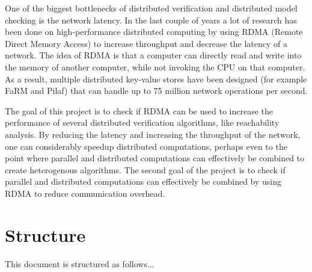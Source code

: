 One of the biggest bottlenecks of distributed verification and distributed model checking is the network latency. In the last couple of years a lot of research has been done on high-performance distributed computing by using RDMA (Remote Direct Memory Access) to increase throughput and decrease the latency of a network. The idea of RDMA is that a computer can directly read and write into the memory of another computer, while not invoking the CPU on that computer. As a result, multiple distributed key-value stores have been designed (for example FaRM and Pilaf) that can handle up to 75 million network operations per second. 

The goal of this project is to check if RDMA can be used to increase the performance of several distributed verification algorithms, like reachability analysis. By reducing the latency and increasing the throughput of the network, one can considerably speedup distributed computations, perhaps even to the point where parallel and distributed computations can effectively be combined to create heterogenous algorithms. The second goal of the project is to check if parallel and distributed computations can effectively be combined by using RDMA to reduce communication overhead.

\section{Structure}
This document is structured as follows...